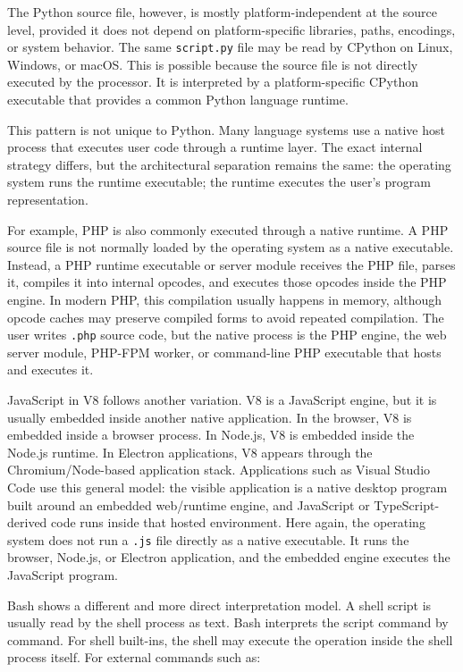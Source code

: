 \documentclass[a4paper,twoside]{report}
\begin{document}
The Python source file, however, is mostly platform-independent at the source level, provided it does not depend on platform-specific libraries, paths, encodings, or system behavior. The same \texttt{script.py} file may be read by CPython on Linux, Windows, or macOS. This is possible because the source file is not directly executed by the processor. It is interpreted by a platform-specific CPython executable that provides a common Python language runtime.

This pattern is not unique to Python. Many language systems use a native host process that executes user code through a runtime layer. The exact internal strategy differs, but the architectural separation remains the same: the operating system runs the runtime executable; the runtime executes the user's program representation.

For example, PHP is also commonly executed through a native runtime. A PHP source file is not normally loaded by the operating system as a native executable. Instead, a PHP runtime executable or server module receives the PHP file, parses it, compiles it into internal opcodes, and executes those opcodes inside the PHP engine. In modern PHP, this compilation usually happens in memory, although opcode caches may preserve compiled forms to avoid repeated compilation. The user writes \texttt{.php} source code, but the native process is the PHP engine, the web server module, PHP-FPM worker, or command-line PHP executable that hosts and executes it.

JavaScript in V8 follows another variation. V8 is a JavaScript engine, but it is usually embedded inside another native application. In the browser, V8 is embedded inside a browser process. In Node.js, V8 is embedded inside the Node.js runtime. In Electron applications, V8 appears through the Chromium/Node-based application stack. Applications such as Visual Studio Code use this general model: the visible application is a native desktop program built around an embedded web/runtime engine, and JavaScript or TypeScript-derived code runs inside that hosted environment. Here again, the operating system does not run a \texttt{.js} file directly as a native executable. It runs the browser, Node.js, or Electron application, and the embedded engine executes the JavaScript program.

Bash shows a different and more direct interpretation model. A shell script is usually read by the shell process as text. Bash interprets the script command by command. For shell built-ins, the shell may execute the operation inside the shell process itself. For external commands such as:
\end{document}

